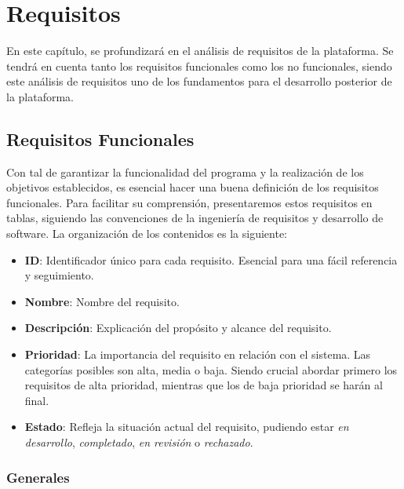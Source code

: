 \chapter{Requisitos} \label{chap:requisitos}

En este capítulo, se profundizará en el análisis de requisitos de la plataforma. Se tendrá en cuenta tanto los requisitos funcionales como los no funcionales, siendo este análisis de requisitos uno de los fundamentos para el desarrollo posterior de la plataforma.

\section{Requisitos Funcionales}

Con tal de garantizar la funcionalidad del programa y la realización de los objetivos establecidos, es esencial hacer una buena definición de los requisitos funcionales. Para facilitar su comprensión, presentaremos estos requisitos en tablas, siguiendo las convenciones de la ingeniería de requisitos y desarrollo de software. La organización de los contenidos es la siguiente:

\begin{itemize}
    \item \textbf{ID}: Identificador único para cada requisito. Esencial para una fácil referencia y seguimiento.
    \item \textbf{Nombre}: Nombre del requisito.
    \item \textbf{Descripción}: Explicación del propósito y alcance del requisito.
    \item \textbf{Prioridad}: La importancia del requisito en relación con el sistema. Las categorías posibles son alta, media o baja. Siendo crucial abordar primero los requisitos de alta prioridad, mientras que los de baja prioridad se harán al final.
    \item \textbf{Estado}: Refleja la situación actual del requisito, pudiendo estar \textit{en desarrollo}, \textit{completado}, \textit{en revisión} o \textit{rechazado}.
\end{itemize}


\subsection{Generales}

